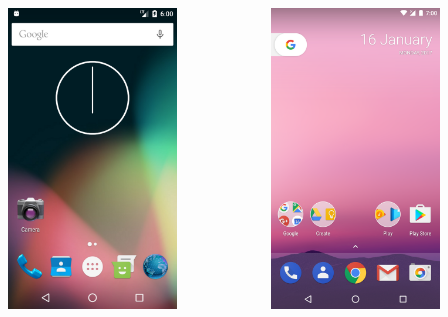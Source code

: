 \documentclass[12pt]{beamer}
\begin{document}
\begin{frame}
\begin{columns}
\begin{column}{0.3\textwidth}
                \includegraphics[width=0.7\textwidth]{android-6-0.png}
            \end{column}
            \begin{column}{0.3\textwidth}
                \includegraphics[width=0.7\textwidth]{android-7-0.png}

\end{column}
\end{columns}
\end{frame}
\end{document}
